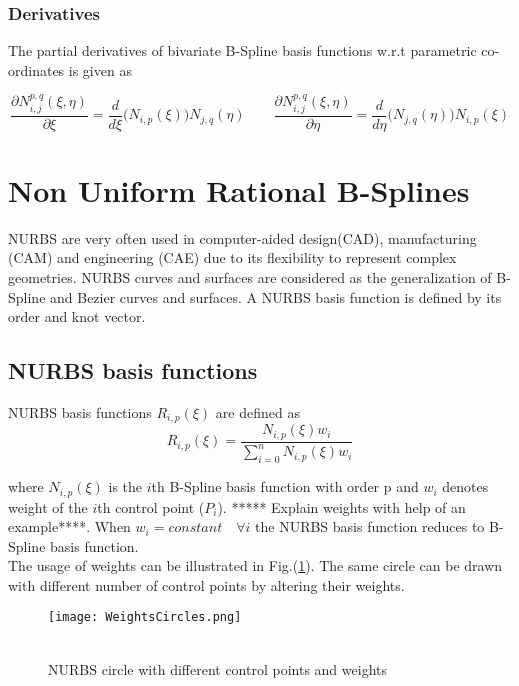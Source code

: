 \documentclass[11pt]{article}
\begin{document}
\subsubsection{Derivatives}

The partial derivatives of bivariate B-Spline basis functions w.r.t parametric
co-ordinates is given as

\begin{equation} 
\frac{\partial N_{i,j}^{p,q}(\xi,\eta)}{\partial \xi} = \frac{d}{d\xi}
\bigg(N_{i,p}(\xi)\bigg)N_{j,q}(\eta) 
\qquad
\frac{\partial N_{i,j}^{p,q}(\xi,\eta)}{\partial \eta} = \frac{d}{d\eta}
\bigg(N_{j,q}(\eta)\bigg)N_{i,p}(\xi)
\end{equation}


\section{Non Uniform Rational B-Splines } \label{NURBS}
NURBS are very often used in computer-aided design(CAD), manufacturing (CAM) and
engineering (CAE) due to its flexibility to represent complex geometries. NURBS
curves and surfaces are considered as the generalization of B-Spline and Bezier
curves and surfaces. A NURBS basis function is defined by its order and knot
vector.

\subsection{NURBS basis functions}
NURBS basis functions $R_{i,p}(\xi)$ are defined as
\begin{equation}
R_{i,p}(\xi) = \frac{N_{i,p}(\xi)w_{i}}{\sum_{i=0}^{n}N_{i,p}(\xi)w_{i}}
\end{equation}

\noindent
where $N_{i,p}(\xi)$ is the $i$th B-Spline basis function with order p and
$w_{i}$ denotes weight of the $i$th control point ($P_i$). ***** Explain weights
with help of an example****. When $w_{i} = constant \quad \forall i$ the NURBS
basis function reduces to B-Spline basis function.
\\The usage of weights can be illustrated in Fig.(\ref{WeightsCircles}). The same circle can be drawn with different number of control points by altering their weights.
\begin{figure}[H]
	\begin{center}
		\texttt{[image: WeightsCircles.png]} 
		\caption{\\NURBS circle with different control points and weights}\label{WeightsCircles}
	\end{center}	
\end{figure}
\end{document}
